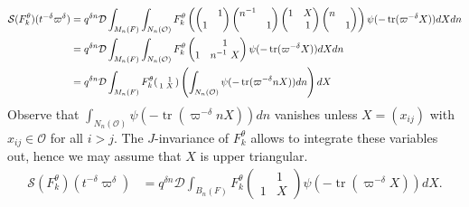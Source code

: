 \documentclass{amsart}
\theoremstyle{definition}
\newcommand{\tr}{\operatorname{tr}}
\newenvironment{spmatrix}{\left(\begin{smallmatrix}}{\end{smallmatrix}\right)}
\begin{document}
{\begin{align*}
\mathcal{S}(F_k^\theta)(t^{-\delta}\varpi^\delta )&=q^{\delta n}\mathcal{D}\int_{M_n(F)}\int_{N_n(\mathcal{O})}F_k^\theta \left(\begin{pmatrix}
&1\\1&\end{pmatrix}\begin{pmatrix}
n^{-1}&\\&1\end{pmatrix}\begin{pmatrix}
1&X\\&1\end{pmatrix}\begin{pmatrix}
n&\\&1\end{pmatrix}\right)\psi(-\tr(\varpi^{-\delta}X))dXdn\\
 &= q^{\delta n}\mathcal{D}\int_{M_n(F)}\int_{N_n(\mathcal{O})}F_k^\theta \begin{pmatrix}&1\\1&n^{-1}~X\end{pmatrix}\psi(-\tr(\varpi^{-\delta}X))dXdn\\
  &=q^{\delta n}\mathcal{D}\int_{M_n(F)} F_k^\theta \begin{spmatrix}&1\\1&X\end{spmatrix} \left(\int_{N_n(\mathcal{O})}\psi(-\tr(\varpi^{-\delta} nX))dn\right)dX
\end{align*}
Observe that $\displaystyle \int_{N_n(\mathcal{O})}\psi(-\tr(\varpi^{-\delta}nX))dn$ vanishes unless $X=(x_{ij})$ with $x_{ij}\in \mathcal{O}$ for
all $i>j$. The $J$-invariance of $F_k^\theta$ allows to integrate these variables out, hence we may assume that  $X$ is upper triangular. 
\begin{align*}
\mathcal{S}(F^\theta_k)(t^{-\delta}\varpi^\delta )&=q^{\delta n}\mathcal{D}\int_{B_n(F)} F_k^\theta
                  \begin{pmatrix}&1\\1&X\end{pmatrix}\psi(-\tr(\varpi^{-\delta}X))dX.
\end{align*}

}
\end{document}
